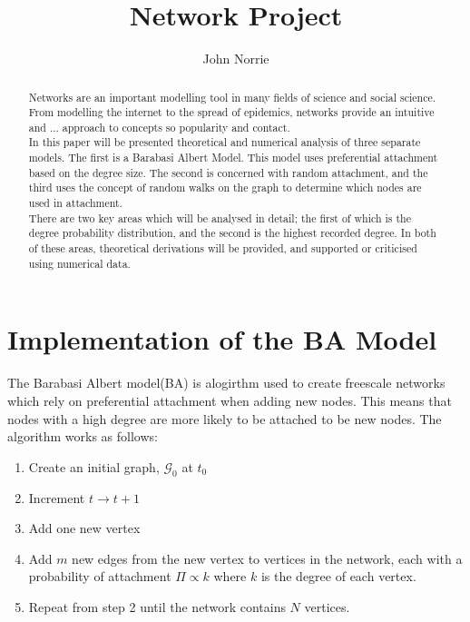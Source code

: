 \documentclass[]{article}
\title{Network Project}
\author{John Norrie}
\begin{document}
\maketitle

\begin{abstract}
Networks are an important modelling tool in many fields of science and social science. From modelling the internet to the spread of epidemics, networks provide an intuitive and ... approach to concepts so popularity and contact. \\
In this paper will be presented theoretical and numerical analysis of three separate models. The first is a Barabasi Albert Model. This model uses preferential attachment based on the degree size. The second is concerned with random attachment, and the third uses the concept of random walks on the graph to determine which nodes are used in attachment.\\
There are two key areas which will be analysed in detail; the first of which is the degree probability distribution, and the second is the highest recorded degree. In both of these areas, theoretical derivations will be provided, and supported or criticised using numerical data.  
\end{abstract}
\clearpage
\section{Implementation of the BA Model}
The Barabasi Albert model(BA) is alogirthm used to create freescale networks which rely on preferential attachment when adding new nodes. This means that nodes with a high degree are more likely to be attached to be new nodes. The algorithm works as follows:
\begin{enumerate}
	\item Create an initial graph, $\mathcal{G}_0$ at $t_0$ 
	\item Increment $t \rightarrow t+1$
	\item Add one new vertex
	\item Add $m$ new edges from the new vertex to vertices in the network, each with a probability of attachment $\Pi \propto k$ where $k$ is the degree of each vertex.
	\item Repeat from step 2 until the network contains $N$ vertices.
\end{enumerate}
\end{document}
